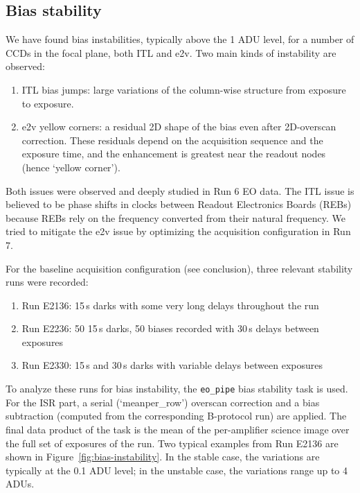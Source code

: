 
\subsection{Bias stability}\label{sec:bias-stability-2}

We have found bias instabilities, typically above the 1 ADU level, for a number of CCDs in the focal plane, both ITL and e2v. Two main kinds of instability are observed:

\begin{enumerate}
\tightlist
\item
  ITL bias jumps: large variations of the column-wise structure from
  exposure to exposure.
\item
  e2v yellow corners: a residual 2D shape of the bias even after
  2D-overscan correction. These residuals depend on the acquisition
  sequence and the exposure time, and the enhancement is greatest near the readout nodes (hence `yellow corner').
\end{enumerate}

Both issues were observed and deeply studied in Run 6 EO data. The ITL
issue is believed to be phase shifts in clocks between Readout
Electronics Boards (REBs) because REBs rely on the frequency converted
from their natural frequency. We tried to mitigate the e2v issue by
optimizing the acquisition configuration in Run 7.

For the baseline acquisition configuration (see conclusion), three
relevant stability runs were recorded:

\begin{enumerate}
\tightlist
\item
  Run E2136: 15\,s darks with some very long delays throughout the run
\item
  Run E2236: 50 15\,s darks, 50 biases recorded with 30\,s delays between
  exposures
\item
  Run E2330: 15\,s and 30\,s darks with variable delays between exposures
\end{enumerate}

To analyze these runs for bias instability, the {\tt eo\_pipe} bias
stability task is used.  For the ISR part, a serial
(`meanper\_row')
overscan correction and a bias subtraction (computed from the
corresponding B-protocol run) are applied. The final data product of the task is the
mean of the per-amplifier science image over the full set of exposures
of the run. Two typical examples from Run E2136 are shown in Figure~\ref{fig:bias-instability}. In the stable case, the variations are typically at the 0.1 ADU
level; in the unstable case, the variations range up to 4 ADUs.

